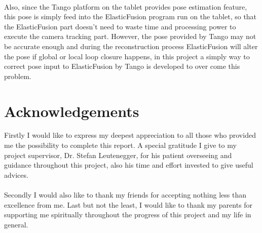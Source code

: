 \documentclass[12pt,twoside]{article}
\begin{document}
\\
Also, since the Tango platform on the tablet provides pose estimation feature, this pose is simply feed into the ElasticFusion program run on the tablet, so that the ElasticFusion part doesn't need to waste time and processing power to execute the camera tracking part. However, the pose provided by Tango may not be accurate enough and during the reconstruction process ElasticFusion will alter the pose if global or local loop closure happens, in this project a simply way to correct pose input to ElasticFusion by Tango is developed to  over come this problem.


\newpage

\section{Acknowledgements}
Firstly I would like to express my deepest appreciation to all those who provided me the possibility to complete this report. A special gratitude I give to my project supervisor, Dr. Stefan Leutenegger, for his patient overseeing and guidance throughout this project, also his time and effort invested to give useful advices.\\
\\
Secondly I would also like to thank my friends for accepting nothing less than excellence from me. Last but not the least, I would like to thank my parents for supporting me spiritually throughout the progress of this project and my life in general.

\newpage


\tableofcontents


\newpage
\end{document}
